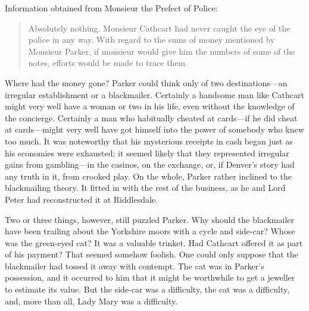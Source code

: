 Information obtained from Monsieur the Prefect of Police:

\begin{quote}
Absolutely nothing. Monsieur Cathcart had never caught the eye of the police in any way. With regard to the sums of money mentioned by Monsieur Parker, if monsieur would give him the numbers of some of the notes, efforts would be made to trace them.
\end{quote}

Where had the money gone? Parker could think only of two destinations\allowbreak---\allowbreak an irregular establishment or a blackmailer. Certainly a handsome man like Cathcart might very well have a woman or two in his life, even without the knowledge of the concierge. Certainly a man who habitually cheated at cards\allowbreak---\allowbreak if he did cheat at cards\allowbreak---\allowbreak might very well have got himself into the power of somebody who knew too much.  It was noteworthy that his mysterious receipts in cash began just as his economies were exhausted; it seemed likely that they represented irregular gains from gambling\allowbreak---\allowbreak in the casinos, on the exchange, or, if Denver's story had any truth in it, from crooked play. On the whole, Parker rather inclined to the blackmailing theory. It fitted in with the rest of the business, as he and Lord Peter had reconstructed it at Riddlesdale.

Two or three things, however, still puzzled Parker. Why should the blackmailer have been trailing about the Yorkshire moors with a cycle and side-car? Whose was the green-eyed cat? It was a valuable trinket.  Had Cathcart offered it as part of his payment? That seemed somehow foolish. One could only suppose that the blackmailer had tossed it away with contempt. The cat was in Parker's possession, and it occurred to him that it might be worthwhile to get a jeweller to estimate its value.  But the side-car was a difficulty, the cat was a difficulty, and, more than all, Lady Mary was a difficulty.

